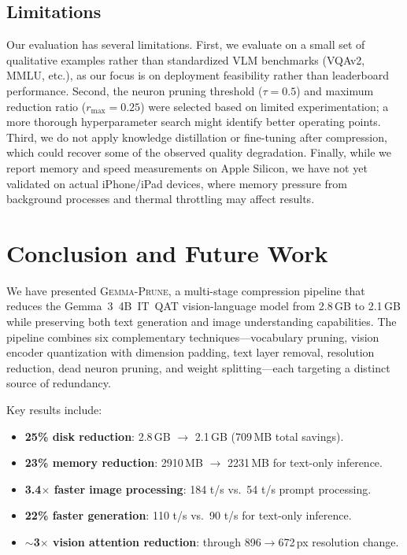 \documentclass[11pt]{article}
\newcommand{\gemma}{\textsc{Gemma-Prune}}
\begin{document}
\subsection{Limitations}

Our evaluation has several limitations. First, we evaluate on a small set of qualitative examples rather than standardized VLM benchmarks (VQAv2, MMLU, etc.), as our focus is on deployment feasibility rather than leaderboard performance. Second, the neuron pruning threshold ($\tau = 0.5$) and maximum reduction ratio ($r_{\max} = 0.25$) were selected based on limited experimentation; a more thorough hyperparameter search might identify better operating points. Third, we do not apply knowledge distillation or fine-tuning after compression, which could recover some of the observed quality degradation. Finally, while we report memory and speed measurements on Apple Silicon, we have not yet validated on actual iPhone/iPad devices, where memory pressure from background processes and thermal throttling may affect results.

\section{Conclusion and Future Work}
\label{sec:conclusion}

We have presented \gemma{}, a multi-stage compression pipeline that reduces the Gemma~3~4B~IT~QAT vision-language model from 2.8\,GB to 2.1\,GB while preserving both text generation and image understanding capabilities. The pipeline combines six complementary techniques---vocabulary pruning, vision encoder quantization with dimension padding, text layer removal, resolution reduction, dead neuron pruning, and weight splitting---each targeting a distinct source of redundancy.

Key results include:
\begin{itemize}[leftmargin=*]
    \item \textbf{25\% disk reduction}: 2.8\,GB $\rightarrow$ 2.1\,GB (709\,MB total savings).
    \item \textbf{23\% memory reduction}: 2910\,MB $\rightarrow$ 2231\,MB for text-only inference.
    \item \textbf{3.4$\times$ faster image processing}: 184 t/s vs.\ 54 t/s prompt processing.
    \item \textbf{22\% faster generation}: 110 t/s vs.\ 90 t/s for text-only inference.
    \item \textbf{$\sim$3$\times$ vision attention reduction}: through 896$\rightarrow$672\,px resolution change.
\end{itemize}
\end{document}
